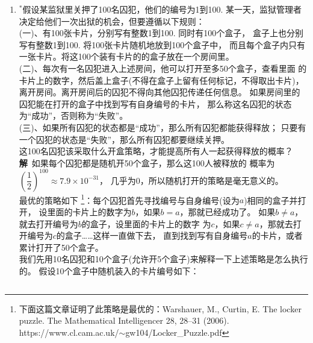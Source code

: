 \begin{enumerate}[label={【\textbf{例\thechapter.\arabic*}】},
 leftmargin=\inteval{\myenumleftmargin}pt,
 itemsep=\inteval{\myenumitempsep}pt,
 itemindent=\inteval{\myenumitemindent}pt]
\textbf{圆排列问题}：把$n$个不同元素放在圆周上的$n$个地位平等
的位置上，特点是\underline{不存在起点}
\underline{和终点}，如果把一种排列
方法旋转一定角度后能得到另一种排列方法，那就认为这两种排列方法
是同一种。比如$(a,b,c,d); (b,c,d,a); (c,d,a,b); (d,a,b,c)$
就是同一种圆排列。$n$个不同元素做直线全排列的方法数为$n!$，
某个元素(比如$a$元素)可以出现在$n$个位置的任意一个，
但$a$出现在$n$个不同的(直线)位置却可以是同一种圆排列，所以
$n$个不同元素的圆排列方法数为$\dfrac{n!}{n}=(n-1)!$.

\item $^*$假设某监狱里关押了100名囚犯，他们的编号为1到100. 
某一天，监狱管理者决定给他们一次出狱的机会，但要遵循以下规则：\\
(一)、有100张卡片，分别写有整数1到100. 同时有100个盒子，
盒子上也分别写有整数1到100. 将100张卡片随机地放到100个盒子中，
而且每个盒子内只有一张卡片。将这100个装有卡片的的盒子放在一个房间里。\\
(二)、每次有一名囚犯进入上述房间，他可以打开至多50个盒子，查看里面
的卡片上的数字，然后盖上盒子(不得在盒子上留有任何标记，不得取出卡片)，
离开房间。离开房间后的囚犯不得向其他囚犯传递任何信息。
如果房间里的囚犯能在打开的盒子中找到写有自身编号的卡片，
那么称这名囚犯的状态为“成功”，否则称为“失败”。\\
(三)、如果所有囚犯的状态都是“成功”，那么所有囚犯都能获得释放；
只要有一个囚犯的状态是“失败”，那么所有囚犯都要继续关押。\\
这100名囚犯该采取什么开盒策略，才能提高所有人一起获得释放的概率？\\
\textbf{解}\ 如果每个囚犯都是随机开50个盒子，那么这100人被释放的
概率为$\left(\dfrac{1}{2}\right)^{100}\approx 7.9\times 10^{-31} $，
几乎为0，所以随机打开的策略是毫无意义的。 \\
最优的策略如下
\footnote{下面这篇文章证明了此策略是最优的：Warshauer, M., Curtin, E. The locker puzzle. The Mathematical Intelligencer 28, 28–31 (2006). https://www.cl.cam.ac.uk/$\sim $gw104/Locker\_Puzzle.pdf }：每个囚犯首先寻找编号与自身编号(设为$a$)相同的盒子并打开，
设里面的卡片上的数字为$b$，如果$b=a$，那就已经成功了。
如果$b\neq a$，就去打开编号为$b$的盒子，设里面的卡片上的数字
为$c$，如果$c\neq a$，那就去打开编号为$c$的盒子……这样一直做下去，
直到找到写有自身编号$a$的卡片，或者累计打开了50个盒子。\\
我们先用10名囚犯和10个盒子(允许开5个盒子)来解释一下上述策略是怎么执行的。
假设10个盒子中随机装入的卡片编号如下：
\begin{table}[H] 
    \centering
    \renewcommand\arraystretch{1}
    \begin{tabular}{|c|c|c|c|c|c|c|c|c|c|c|}

\end{tabular}
\end{table}
\end{enumerate}
